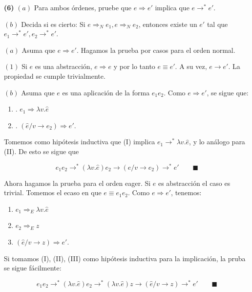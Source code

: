 \documentclass[article, 12pt]{article}
\begin{document}
\pagebreak 

\begin{myframe}
  \textbf{(6)} $(a)$ Para ambos órdenes, pruebe que $e \Rightarrow e'$ implica que $e
  \to^* e'$.

  $(b)$ Decida si es cierto: Si $e \Rightarrow_N e_1, e \Rightarrow_N e_2$,
  entonces existe un $e'$ tal que $e_1 \to^* e', e_2 \to^* e'$.
\end{myframe}

$(a)$ Asuma que $e \Rightarrow e'$. Hagamos la prueba por casos para el orden
normal.

$(1)$ Si $e$ es una abstracción, $e \Rightarrow e$ y por lo tanto $e \equiv e'$.
A su vez, $e \to e'$. La propiedad se cumple trivialmente.

$(b)$ Asuma que $e$ es una aplicación de la forma $e_1 e_2$. Como $e \Rightarrow
e'$, se sigue que: 

\begin{enumerate}[I]
  \item. $e_1 \Rightarrow \lambda v. \hat{e}$ 
  \item. $( \hat{e} / v \to  e_2 ) \Rightarrow e'$.
\end{enumerate}

Tomemos como hipótesis inductiva que (I) implica $e_1 \to^* \lambda v.\hat{e}$, y
lo análogo para (II). De esto se sigue que

\begin{equation*}
  e_1 e_2 \to^* (\lambda v. \hat{e})e_2 \to  ( \hat{e} / v\to e_2 ) \to^* e'
  \qquad \blacksquare
\end{equation*}

Ahora hagamos la prueba para el orden eager. Si $e$ es abstracción el caso es
trivial. Tomemos el ecaso en que $e \equiv e_1 e_2$. Como $e \Rightarrow e'$,
tenemos: 

\begin{enumerate}[I]
  \item $e_1 \Rightarrow_E \lambda v.\hat{e}$ 
  \item $e_2 \Rightarrow_E z$  
  \item $( \hat{e} / v \to z) \Rightarrow e' $.
\end{enumerate}

Si tomamos (I), (II), (III) como hipótesis inductiva para la implicación, la
pruba se sigue fácilmente: 

\begin{equation*}
  e_1e_2 \to^* (\lambda v.\hat{e})e_2 \to^* (\lambda v. \hat{e})z \to (\hat{e} /
  v \to  z) \to^* e' \qquad \blacksquare
\end{equation*}
\end{document}
